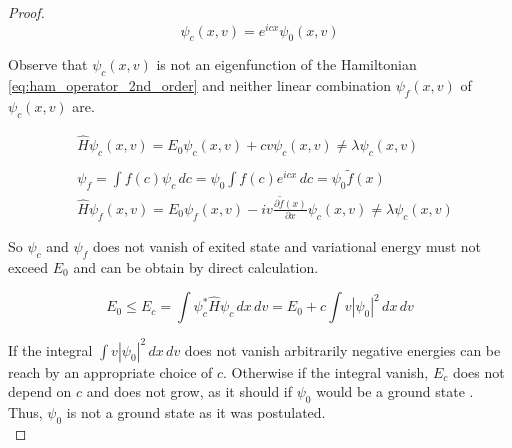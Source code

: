 \begin{proof}
  \begin{equation}
    \psi_c(x, v) = e^{icx}\psi_0(x,v)
  \end{equation}

  Observe that $\psi_c(x,v)$ is not an eigenfunction of the Hamiltonian
  \eqref{eq:ham_operator_2nd_order} and neither linear combination $\psi_f(x,v)$
  of $\psi_c(x,v)$ are.

  \begin{align*}
    &\hat{H} \psi_c(x,v) = E_0\psi_c(x, v) + cv \psi_c(x,v)
    \neq \lambda \psi_c(x,v) \\ \\
    &\psi_f = \int f(c) \psi_c \, dc = \psi_0 \int f(c) e^{icx} \, dc =
    \psi_0 \tilde{f}(x) \\
    &\hat{H} \psi_f(x,v) = E_0\psi_f(x, v) -
    iv \frac{\partial \tilde{f}(x)}{\partial x} \psi_c(x,v)
    \neq \lambda \psi_c(x,v)
  \end{align*}

  So $\psi_c$ and $\psi_f$ does not vanish of exited state and variational
  energy must not exceed $E_0$ and can be obtain by direct calculation.

  \begin{equation*}
    E_0 \leq E_c = \int \psi_c^* \hat{H} \psi_c \, dx \, dv =
    E_0 + c \int v \left|\psi_0 \right| ^2 \, dx \, dv
  \end{equation*}

  If the integral $\int v \left|\psi_0 \right| ^2 \, dx \, dv$ does not vanish
  arbitrarily negative energies can be reach by an appropriate choice of $c$.
  Otherwise if the integral vanish, $E_c$ does not depend on $c$ and does not
  grow, as it should if $\psi_0$ would be a ground state \cite{Smilga17}. Thus,
  $\psi_0$ is not a ground state as it was postulated. \\
\end{proof}
